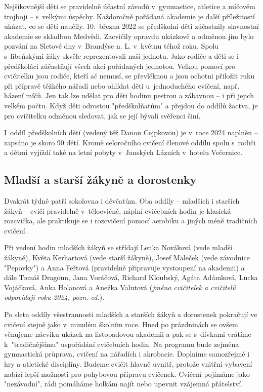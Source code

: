 \documentclass[a5paper, 11pt, twoside]{article}
\begin{document}
Nejšikovnější děti se pravidelně účastní závodů v~gymnastice, atletice a
míčovém trojboji -- s~velkými úspěchy. Každoročně pořádaná akademie je
další příležitostí ukázat, co se děti naučily. 10.~března 2022 se
předškolní děti zúčastnily slavnostní akademie se skladbou Medvědi.
Zacvičily opravdu ukázkově a odměnou jim bylo pozvání na Sletové dny
v~Brandýse n. L. v~květnu téhož roku. Spolu s~libeňskými žáky skvěle
reprezentovali naši jednotu. Jako rodiče a děti se i předškoláci
zúčastňují všech akcí pořádaných jednotou. Velkou pomocí pro cvičitelku
jsou rodiče, kteří ač nemusí, se převléknou a jsou ochotni přiložit ruku
při přípravě těžkého nářadí nebo ohlídat děti u~jednoduchého cvičení,
např. házení míčů. Jen tak lze udělat pro děti hodinu pestrou a zábavnou
-- i při jejich velkém počtu. Když děti odrostou "předškolňatům" a
přejdou do oddílů žactva, je pro cvičitelku odměnou sledovat, jak se
její bývalí svěřenci činí.

I~oddíl předškolních dětí (vedený též Danou Cejpkovou) je v~roce 2024
naplněn -- zapsáno je skoro 90 dětí. Kromě celoročního cvičení členové
oddílu spolu s~rodiči a dětmi vyjíždí také na letní pobyty v~Janských
Lázních v~hotelu Večernice.

\subsection{Mladší a starší žákyně a dorostenky}

Dvakrát týdně patří sokolovna i děvčatům. Oba oddíly -- mladších i
starších žákyň -- cvičí pravidelně v~tělocvičně, náplní cvičebních hodin
je klasická rozcvička, ale praktikuje se i rozcvičení pomocí aerobiku a
jiných méně tradičních cvičení.

Při vedení hodin mladších žákyň se střídají Lenka Nováková (vede mladší
žákyně), Květa Kerhartová (vede starší žákyně), Josef Maleček (vede
závodnice "Pepovky") a Anna Feřtová (pravidelně připravuje vystoupení
na akademii) a dále Tomáš Dragoun, Jana Voráčová, Richard Kloubský,
Agáta Adámková, Lucka Vojáčková, Anka Holanová a Anežka Valutová
(\textit{jména cvičitelek a cvičitelů odpovídají roku 2024, pozn. ed.}).

{\sloppy Po sletu oddíly všestrannosti mladších a starších žákyň a dorostenek
pokračují ve cvičení stejně jako v~minulém školním roce. Hned po
prázdninách se ovšem věnujeme nácviku ukázek na listopadovou akademii a
pak se s~dívkami vrátíme k~"tradičnějšímu" uspořádání cvičebních
hodin. Na programu bude zejména gymnastická průprava, cvičení na
nářadích i akrobacie. Doplníme samozřejmě i hry a atletické disciplíny.
Budeme cvičit hlavně uvnitř, protože vnitřní vybavení nabízí lepší
možnosti pro pohybovou přípravu cvičenek. Cvičení pojímáme jako
"nezávodní", rádi pomáháme holkám najít nebo upevnit vzájemná
přátelství. \par}
\end{document}
